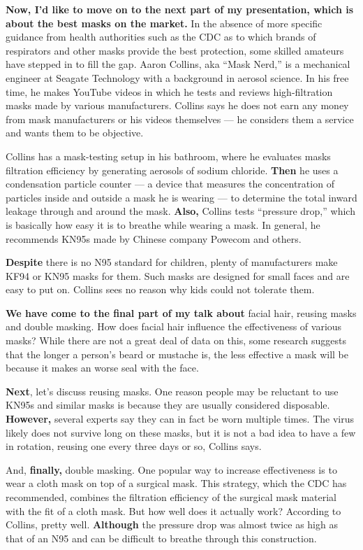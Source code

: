 \documentclass[a4paper, 14pt]{extarticle}
\renewcommand{\emph}{\textbf}
\begin{document}
\emph{Now, I’d like to move on to the next part of my presentation, which is about the best masks on the market.}
In the absence of more specific guidance from health authorities such as the CDC as to which brands of respirators and other masks provide the best protection, some skilled amateurs have  stepped in to fill the gap. Aaron Collins, aka “Mask Nerd,” is a mechanical engineer at Seagate Technology with a background in aerosol science. In his free time, he makes YouTube videos in which he tests and reviews high-filtration masks made by various manufacturers. Collins says he does not earn any money from mask manufacturers or his videos themselves --- he considers them a service and wants them to be objective.

Collins has a mask-testing setup in his bathroom, where he evaluates masks filtration efficiency by generating aerosols of sodium chloride. \emph{Then} he uses a condensation particle counter --- a device that measures the concentration of particles inside and outside a mask he is wearing --- to determine the total inward leakage through and around the mask. \emph{Also,} Collins tests “pressure drop,” which is basically how easy it is to breathe while wearing a mask. In general, he recommends KN95s made by Chinese company Powecom and others.

\emph{Despite} there is no N95 standard for children, plenty of manufacturers make KF94 or KN95 masks for them. Such masks are designed for small faces and are easy to put on. Collins sees no reason why kids could not tolerate them.


\emph{We have come to the final part of my talk about} facial hair, reusing masks and double masking.
How does facial hair influence the effectiveness of various masks? While there are not a great deal of data on this, some research suggests that the longer a person’s beard or mustache is, the less effective a mask will be because it makes an worse seal with the face.


\emph{Next}, let's discuss reusing masks. One reason people may be reluctant to use KN95s and similar masks is because they are usually considered disposable. \emph{However,} several experts say they can in fact be worn multiple times.
The virus likely does not survive long on these masks, but it is not a bad idea to have a few in rotation, reusing one every three days or so, Collins says.

And, \emph{finally,} double masking. One popular way to increase effectiveness is to wear a cloth mask on top of a surgical mask. This strategy, which the CDC has recommended, combines the filtration efficiency of the surgical mask material with the fit of a cloth mask. But how well does it actually work? According to Collins, pretty well. \emph{Although} the pressure drop was almost twice as high as that of an N95 and can be difficult to breathe through this construction. 
\end{document}
